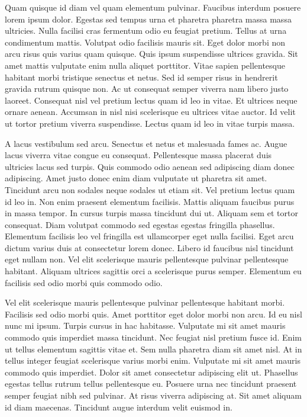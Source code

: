 \documentclass[11pt,a4paper]{article}
\begin{document}
Quam quisque id diam vel quam elementum pulvinar. Faucibus interdum posuere lorem ipsum dolor. Egestas sed tempus urna et pharetra pharetra massa massa ultricies. Nulla facilisi cras fermentum odio eu feugiat pretium. Tellus at urna condimentum mattis. Volutpat odio facilisis mauris sit. Eget dolor morbi non arcu risus quis varius quam quisque. Quis ipsum suspendisse ultrices gravida. Sit amet mattis vulputate enim nulla aliquet porttitor. Vitae sapien pellentesque habitant morbi tristique senectus et netus. Sed id semper risus in hendrerit gravida rutrum quisque non. Ac ut consequat semper viverra nam libero justo laoreet. Consequat nisl vel pretium lectus quam id leo in vitae. Et ultrices neque ornare aenean. Accumsan in nisl nisi scelerisque eu ultrices vitae auctor. Id velit ut tortor pretium viverra suspendisse. Lectus quam id leo in vitae turpis massa.

A lacus vestibulum sed arcu. Senectus et netus et malesuada fames ac. Augue lacus viverra vitae congue eu consequat. Pellentesque massa placerat duis ultricies lacus sed turpis. Quis commodo odio aenean sed adipiscing diam donec adipiscing. Amet justo donec enim diam vulputate ut pharetra sit amet. Tincidunt arcu non sodales neque sodales ut etiam sit. Vel pretium lectus quam id leo in. Non enim praesent elementum facilisis. Mattis aliquam faucibus purus in massa tempor. In cursus turpis massa tincidunt dui ut. Aliquam sem et tortor consequat. Diam volutpat commodo sed egestas egestas fringilla phasellus. Elementum facilisis leo vel fringilla est ullamcorper eget nulla facilisi. Eget arcu dictum varius duis at consectetur lorem donec. Libero id faucibus nisl tincidunt eget nullam non. Vel elit scelerisque mauris pellentesque pulvinar pellentesque habitant. Aliquam ultrices sagittis orci a scelerisque purus semper. Elementum eu facilisis sed odio morbi quis commodo odio.

Vel elit scelerisque mauris pellentesque pulvinar pellentesque habitant morbi. Facilisis sed odio morbi quis. Amet porttitor eget dolor morbi non arcu. Id eu nisl nunc mi ipsum. Turpis cursus in hac habitasse. Vulputate mi sit amet mauris commodo quis imperdiet massa tincidunt. Nec feugiat nisl pretium fusce id. Enim ut tellus elementum sagittis vitae et. Sem nulla pharetra diam sit amet nisl. At in tellus integer feugiat scelerisque varius morbi enim. Vulputate mi sit amet mauris commodo quis imperdiet. Dolor sit amet consectetur adipiscing elit ut. Phasellus egestas tellus rutrum tellus pellentesque eu. Posuere urna nec tincidunt praesent semper feugiat nibh sed pulvinar. At risus viverra adipiscing at. Sit amet aliquam id diam maecenas. Tincidunt augue interdum velit euismod in.
\end{document}
